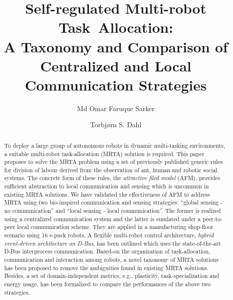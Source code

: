 \documentclass[final,5p,times,twocolumn]{elsarticle}
\begin{document}
\begin{frontmatter}
\title{Self-regulated Multi-robot Task~Allocation:\\ A Taxonomy and Comparison of Centralized and Local Communication Strategies}
\author[label1]{Md Omar Faruque Sarker} 
\author[label1]{Torbj{\o}rn S. Dahl}
\address[label1]{Cognitive Robotics Research Centre\\
Newport Business School,
Allt-yr-yn Campus\\ %
Newport, NP20 5DA,
United Kingdom.}
%
%
%
\begin{abstract}
To deploy a large group of autonomous robots in dynamic multi-tasking environments, a suitable multi-robot task-allocation (MRTA) solution is required. This paper proposes to solve the MRTA problem using a set of previously published generic rules for division of labour derived from the observation of ant, human and robotic social systems. The concrete form of these rules, the \textit{attractive filed model} (AFM), provides sufficient abstraction to local communication and sensing which is uncommon in existing MRTA solutions. We have validated the effectiveness of AFM to address MRTA  using two bio-inspired communication and sensing strategies: ``global sensing - no communication'' and ``local sensing - local communication''. The former is realized using a centralized communication system and the latter is emulated under a peer-to-peer local communication scheme. They are applied in a  manufacturing shop-floor scenario using 16 e-puck robots. A flexible multi-robot control architecture, \textit{hybrid event-driven architecture on D-Bus}, has been outlined which uses the state-of-the-art D-Bus interprocess communication.  Based-on the organization of task-allocation, communication and interaction among robots, a  novel taxonomy of MRTA solutions has been proposed to remove the ambiguities found in existing MRTA solutions. Besides, a set of domain-independent metrics, e.g., plasticity, task-specialization and energy usage, has been formalized to compare the performances of the above two strategies.

\end{abstract}
\end{frontmatter}
\end{document}
